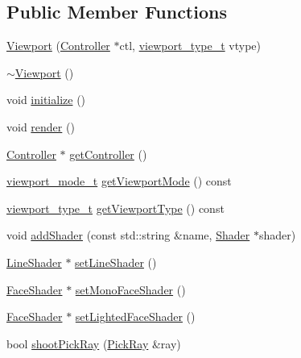 \subsection*{Public Member Functions}
\begin{DoxyCompactItemize}
\item 
\hyperlink{classShipCAD_1_1Viewport_ad946e1cfc34e84610f9d89f3b62baf9d}{Viewport} (\hyperlink{classShipCAD_1_1Controller}{Controller} $\ast$ctl, \hyperlink{namespaceShipCAD_aeeeb05810f2e31ef89fd4ac6b6ba9c0a}{viewport\-\_\-type\-\_\-t} vtype)
\item 
\hyperlink{classShipCAD_1_1Viewport_a1e18a1ff4a52be33ef63d25034561850}{$\sim$\-Viewport} ()
\item 
void \hyperlink{classShipCAD_1_1Viewport_a9c35de3f7c9d7c860c494081b48309b3}{initialize} ()
\item 
void \hyperlink{classShipCAD_1_1Viewport_a9e81b526db3c2b508322c29b9fda5845}{render} ()
\item 
\hyperlink{classShipCAD_1_1Controller}{Controller} $\ast$ \hyperlink{classShipCAD_1_1Viewport_a4a12f9e56634caca61077572fe6b15f9}{get\-Controller} ()
\item 
\hyperlink{namespaceShipCAD_a67437198ee14f74e6c5277d761894863}{viewport\-\_\-mode\-\_\-t} \hyperlink{classShipCAD_1_1Viewport_a205e5082395c6d01660ffc179c57b83e}{get\-Viewport\-Mode} () const 
\item 
\hyperlink{namespaceShipCAD_aeeeb05810f2e31ef89fd4ac6b6ba9c0a}{viewport\-\_\-type\-\_\-t} \hyperlink{classShipCAD_1_1Viewport_a5f261a1925f09917013e8e532688326a}{get\-Viewport\-Type} () const 
\item 
void \hyperlink{classShipCAD_1_1Viewport_a886ac5965b63039799827da89bf3de20}{add\-Shader} (const std\-::string \&name, \hyperlink{classShipCAD_1_1Shader}{Shader} $\ast$shader)
\item 
\hyperlink{classShipCAD_1_1LineShader}{Line\-Shader} $\ast$ \hyperlink{classShipCAD_1_1Viewport_a0720a01f8650dc4acf89aad0649d9196}{set\-Line\-Shader} ()
\item 
\hyperlink{classShipCAD_1_1FaceShader}{Face\-Shader} $\ast$ \hyperlink{classShipCAD_1_1Viewport_ad6be617bdcab76cd2f44b0528371cd5d}{set\-Mono\-Face\-Shader} ()
\item 
\hyperlink{classShipCAD_1_1FaceShader}{Face\-Shader} $\ast$ \hyperlink{classShipCAD_1_1Viewport_a03cc2ed85178b9735c80b11dceb470b5}{set\-Lighted\-Face\-Shader} ()
\item 
bool \hyperlink{classShipCAD_1_1Viewport_aa9af80400534f46e5420916a2895ead5}{shoot\-Pick\-Ray} (\hyperlink{structShipCAD_1_1PickRay}{Pick\-Ray} \&ray)
\end{DoxyCompactItemize}
